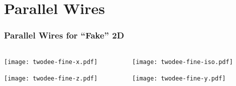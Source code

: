 \documentclass[xcolor=dvipsnames]{beamer}
\begin{document}



\section{Parallel Wires}

\begin{frame}
  \frametitle{Parallel Wires for ``Fake'' 2D}
  \begin{columns}
    \begin{column}{0.4\textwidth}
      \begin{center}
        \texttt{[image: twodee-fine-x.pdf]}

        \texttt{[image: twodee-fine-z.pdf]}
      \end{center}
    \end{column}
    \begin{column}{0.4\textwidth}
      \begin{center}
        \texttt{[image: twodee-fine-iso.pdf]}

        \texttt{[image: twodee-fine-y.pdf]}
      \end{center}
    \end{column}
  \end{columns}
\end{frame}
\end{document}
